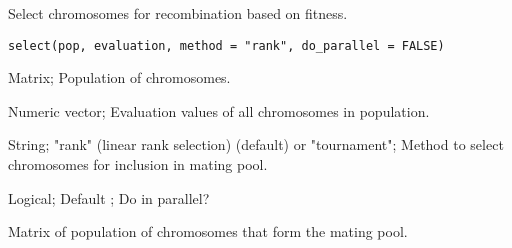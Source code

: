 %
\begin{Description}\relax
Select chromosomes for recombination based on fitness.
\end{Description}
%
\begin{Usage}
\begin{verbatim}
select(pop, evaluation, method = "rank", do_parallel = FALSE)
\end{verbatim}
\end{Usage}
%
\begin{Arguments}
\begin{ldescription}
\item[\code{pop}] Matrix; Population of chromosomes.

\item[\code{evaluation}] Numeric vector; Evaluation values of all chromosomes in population.

\item[\code{method}] String; "rank" (linear rank selection) (default) or
"tournament"; Method to select chromosomes for inclusion in mating pool.

\item[\code{do\_parallel}] Logical; Default ; Do in parallel?
\end{ldescription}
\end{Arguments}
%
\begin{Value}
Matrix of population of chromosomes that form the mating pool.
\end{Value}
